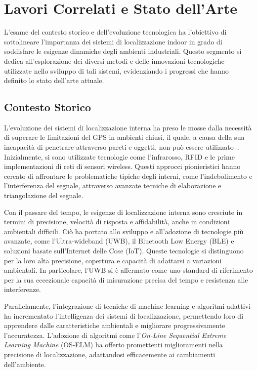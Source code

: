 \chapter{Lavori Correlati e Stato dell'Arte}
\hspace{\parindent}L'esame del contesto storico e dell'evoluzione tecnologica ha l'obiettivo di sottolineare l'importanza dei sistemi di localizzazione indoor in grado di soddisfare le esigenze dinamiche degli ambienti industriali. Questo segmento si dedica all'esplorazione dei diversi metodi e delle innovazioni tecnologiche utilizzate nello sviluppo di tali sistemi, evidenziando i progressi che hanno definito lo stato dell'arte attuale.

\section{Contesto Storico}
\lettrine[lines=2]{L}{'}evoluzione dei sistemi di localizzazione interna ha preso le mosse dalla necessità di superare le limitazioni del GPS in ambienti chiusi, il quale, a causa della sua incapacità di penetrare attraverso pareti e oggetti, non può essere utilizzato~\cite{bisio_pervasive_2011}. Inizialmente, si sono utilizzate tecnologie come l'infrarosso, RFID e le prime implementazioni di reti di sensori wireless. Questi approcci pionieristici hanno cercato di affrontare le problematiche tipiche degli interni, come l'indebolimento e l'interferenza del segnale, attraverso avanzate tecniche di elaborazione e triangolazione del segnale.

Con il passare del tempo, le esigenze di localizzazione interna sono cresciute in termini di precisione, velocità di risposta e affidabilità, anche in condizioni ambientali difficili. Ciò ha portato allo sviluppo e all'adozione di tecnologie più avanzate, come l'Ultra-wideband (UWB), il Bluetooth Low Energy (BLE) e soluzioni basate sull'Internet delle Cose (IoT). Queste tecnologie si distinguono per la loro alta precisione, copertura e capacità di adattarsi a variazioni ambientali. In particolare, l'UWB si è affermato come uno standard di riferimento per la sua eccezionale capacità di misurazione precisa del tempo e resistenza alle interferenze.~\cite{Karaagac2017}

Parallelamente, l'integrazione di tecniche di machine learning e algoritmi adattivi ha incrementato l'intelligenza dei sistemi di localizzazione, permettendo loro di apprendere dalle caratteristiche ambientali e migliorare progressivamente l'accuratezza. L'adozione di algoritmi come l'\textit{On-Line Sequential Extreme Learning Machine} (OS-ELM) ha offerto promettenti miglioramenti nella precisione di localizzazione, adattandosi efficacemente ai cambiamenti dell'ambiente.~\cite{Zou2015}

